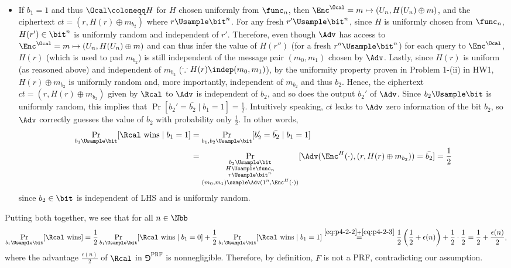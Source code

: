 \begin{answer}[ii]
\begin{itemize}
        \item If $b_1=1$ and thus $\Ocal\coloneqq H$ for $H$ chosen uniformly from $\func_n$, then $\Enc^\Ocal = m\mapsto (U_n, H(U_n)\oplus m)$, and the ciphertext $ct=(r, H(r)\oplus m_{b_2})$ where $r\Usample \bit^n$. For any fresh $r'\Usample\bit^n$, since $H$ is uniformly chosen from $\func_n$, $H(r')\in\bit^n$ is uniformly random and independent of $r'$. Therefore, even though $\Adv$ has access to  $\Enc^\Ocal = m\mapsto (U_n, H(U_n)\oplus m)$ and can thus infer the value of $H(r'')$ (for a fresh $r''\Usample\bit^n$) for each query to $\Enc^\Ocal$, $H(r)$ (which is used to pad $m_{b_2}$) is still independent of the message pair $(m_0, m_1)$ chosen by $\Adv$. Lastly, since $H(r)$ is uniform (as reasoned above) and independent of $m_{b_2}$ ($\because H(r)\indep (m_0, m_1)$), by the uniformity property proven in Problem 1-(ii) in HW1, $H(r)\oplus m_{b_2}$ is uniformly random and, more importantly, independent of $m_{b_2}$ and thus $b_2$. 
        Hence, the ciphertext $ct=(r, H(r)\oplus m_{b_2})$ given by $\Rcal$ to $\Adv$ is independent of $b_2$, and so does the output $b_2'$ of $\Adv$. Since $b_2\Usample\bit$ is uniformly random, this implies that $\Pr[b_2'=\bar{b_2}\mid b_1=1]=\frac{1}{2}$. Intuitively speaking, $ct$ leaks to $\Adv$ zero information of the bit $b_2$, so $\Adv$ correctly guesses the value of $b_2$ with probability only $\frac{1}{2}$. In other words,
        \begin{align}\label{eq:p4-2-3}
            \Pr_{b_1\Usample\bit}[ \Rcal \textrm{ wins}\mid b_1=1]
            &=\Pr_{b_1,b_2\Usample\bit}[ b_2'=\bar{b_2} \mid b_1=1]\notag\\
            &=\Pr_{\substack{b_2\Usample\bit\\H\Usample\func_n\\r\Usample\bit^n\\(m_0,m_1)\sample\Adv(1^n, \Enc^H(\cdot))}}[ \Adv(\Enc^H(\cdot), (r, H(r)\oplus m_{b_2}))=\bar{b_2}]
            =\frac{1}{2}
        \end{align}
        since $b_2\in\bit$ is independent of LHS and is uniformly random. 
    \end{itemize}
    Putting both together, we see that for all $n\in\Nbb$
    \[
        \Pr_{b_1\Usample\bit}[ \Rcal \textrm{ wins}]
        =\frac{1}{2}\Pr_{b_1\Usample\bit}[ \Rcal \textrm{ wins}\mid b_1=0]+\frac{1}{2}\Pr_{b_1\Usample\bit}[ \Rcal \textrm{ wins}\mid b_1=1]
        \stackrel{\eqref{eq:p4-2-2}+\eqref{eq:p4-2-3}}= \frac{1}{2}\left(\frac{1}{2}+\epsilon(n)\right)+\frac{1}{2}\cdot \frac{1}{2}
        = \frac{1}{2}+\frac{\epsilon(n)}{2},
    \]
    where the advantage $\frac{\epsilon(n)}{2}$ of $\Rcal$ in $\Game^{\textrm{PRF}}$ is nonnegligible.
    Therefore, by definition, $F$ is not a PRF, contradicting our assumption. 
\end{answer}